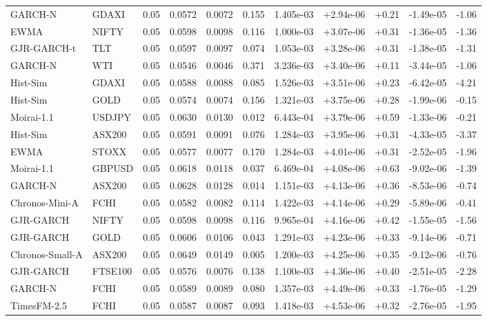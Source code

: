 \begin{tabular}{llrrrrrrrrr}
GARCH-N & GDAXI & 0.05 & 0.0572 & 0.0072 & 0.155 & 1.405e-03 & +2.94e-06 & +0.21 & -1.49e-05 & -1.06 \\
EWMA & NIFTY & 0.05 & 0.0598 & 0.0098 & 0.116 & 1.000e-03 & +3.07e-06 & +0.31 & -1.36e-05 & -1.36 \\
GJR-GARCH-t & TLT & 0.05 & 0.0597 & 0.0097 & 0.074 & 1.053e-03 & +3.28e-06 & +0.31 & -1.38e-05 & -1.31 \\
GARCH-N & WTI & 0.05 & 0.0546 & 0.0046 & 0.371 & 3.236e-03 & +3.40e-06 & +0.11 & -3.44e-05 & -1.06 \\
Hist-Sim & GDAXI & 0.05 & 0.0588 & 0.0088 & 0.085 & 1.526e-03 & +3.51e-06 & +0.23 & -6.42e-05 & -4.21 \\
Hist-Sim & GOLD & 0.05 & 0.0574 & 0.0074 & 0.156 & 1.321e-03 & +3.75e-06 & +0.28 & -1.99e-06 & -0.15 \\
Moirai-1.1 & USDJPY & 0.05 & 0.0630 & 0.0130 & 0.012 & 6.443e-04 & +3.79e-06 & +0.59 & -1.33e-06 & -0.21 \\
Hist-Sim & ASX200 & 0.05 & 0.0591 & 0.0091 & 0.076 & 1.284e-03 & +3.95e-06 & +0.31 & -4.33e-05 & -3.37 \\
EWMA & STOXX & 0.05 & 0.0577 & 0.0077 & 0.170 & 1.284e-03 & +4.01e-06 & +0.31 & -2.52e-05 & -1.96 \\
Moirai-1.1 & GBPUSD & 0.05 & 0.0618 & 0.0118 & 0.037 & 6.469e-04 & +4.08e-06 & +0.63 & -9.02e-06 & -1.39 \\
GARCH-N & ASX200 & 0.05 & 0.0628 & 0.0128 & 0.014 & 1.151e-03 & +4.13e-06 & +0.36 & -8.53e-06 & -0.74 \\
Chronos-Mini-A & FCHI & 0.05 & 0.0582 & 0.0082 & 0.114 & 1.422e-03 & +4.14e-06 & +0.29 & -5.89e-06 & -0.41 \\
GJR-GARCH & NIFTY & 0.05 & 0.0598 & 0.0098 & 0.116 & 9.965e-04 & +4.16e-06 & +0.42 & -1.55e-05 & -1.56 \\
GJR-GARCH & GOLD & 0.05 & 0.0606 & 0.0106 & 0.043 & 1.291e-03 & +4.23e-06 & +0.33 & -9.14e-06 & -0.71 \\
Chronos-Small-A & ASX200 & 0.05 & 0.0649 & 0.0149 & 0.005 & 1.200e-03 & +4.25e-06 & +0.35 & -9.12e-06 & -0.76 \\
GJR-GARCH & FTSE100 & 0.05 & 0.0576 & 0.0076 & 0.138 & 1.100e-03 & +4.36e-06 & +0.40 & -2.51e-05 & -2.28 \\
GARCH-N & FCHI & 0.05 & 0.0589 & 0.0089 & 0.080 & 1.357e-03 & +4.49e-06 & +0.33 & -1.76e-05 & -1.29 \\
TimesFM-2.5 & FCHI & 0.05 & 0.0587 & 0.0087 & 0.093 & 1.418e-03 & +4.53e-06 & +0.32 & -2.76e-05 & -1.95 \\

\end{tabular}
